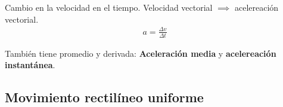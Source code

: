 \documentclass[12pt]{article}
\begin{document}
Cambio en la velocidad en el tiempo. Velocidad vectorial \(\implies\) acelereación vectorial.
\begin{align*}
    a = \frac{\Delta v}{\Delta t}
\end{align*}

También tiene promedio y derivada: 
\textbf{Aceleración media} y \textbf{acelereación instantánea}.

\subsection{Movimiento rectilíneo uniforme}
\end{document}
